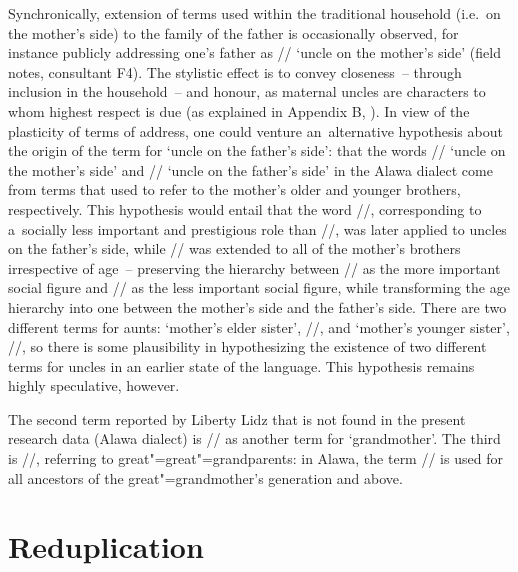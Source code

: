 	Synchronically, extension of terms used within the traditional household (i.e.\ on the mother’s side) to the family of the father is occasionally observed, for instance publicly addressing one's father as // ‘uncle
	on the mother’s side’ (field notes, consultant F4). The stylistic effect is to convey closeness~-- through inclusion in the household~-- and honour, as maternal uncles are characters to whom highest respect is due (as explained in Appendix B, ). In view of the plasticity of terms of address, one could venture
	an~alternative hypothesis about the origin of the term for ‘uncle on the father’s side’: that the words // ‘uncle on the mother’s side’ and // ‘uncle on the father’s side’ in the Alawa dialect come from terms that used to refer to the mother’s
	older and younger brothers, respectively. This hypothesis would entail that the word
	//, corresponding to a~socially less important and prestigious role than //,
	was later applied to uncles on the father’s side, while // was extended to all of the
	mother’s brothers irrespective of age~-- preserving the hierarchy between // as the more
	important social figure and // as the less important social figure, while transforming
	the age hierarchy into one between the mother’s side and the father’s side. There are two different terms for aunts: ‘mother's elder sister’, //, and ‘mother's younger sister’, //, so there is some plausibility in hypothesizing the existence of two different terms for uncles in an earlier state of the language. This hypothesis remains highly speculative, however. 
		
	The second term reported by Liberty Lidz that is not found in the present research data (Alawa dialect) is // as another term for
	‘grandmother’. The third is //, referring to great"=great"=grandparents: in Alawa, the
	term // is used for all ancestors of the great"=grandmother’s generation and above.
	


\section{Reduplication}
\label{sec:reduplicationofnounphraseswithadiscussionofsomemarginalcasesofreduplication}

